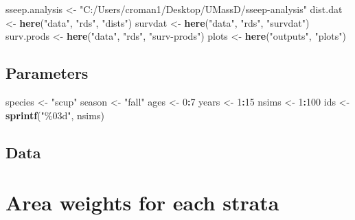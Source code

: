 \documentclass[
]{article}
\newenvironment{Shaded}{\begin{snugshade}}{\end{snugshade}}
\newcommand{\DecValTok}[1]{\textcolor[rgb]{0.00,0.00,0.81}{#1}}
\newcommand{\FunctionTok}[1]{\textcolor[rgb]{0.13,0.29,0.53}{\textbf{#1}}}
\newcommand{\NormalTok}[1]{#1}
\newcommand{\OtherTok}[1]{\textcolor[rgb]{0.56,0.35,0.01}{#1}}
\newcommand{\SpecialCharTok}[1]{\textcolor[rgb]{0.81,0.36,0.00}{\textbf{#1}}}
\newcommand{\StringTok}[1]{\textcolor[rgb]{0.31,0.60,0.02}{#1}}
\begin{document}
\begin{Shaded}
\begin{Highlighting}[]
\NormalTok{sseep.analysis }\OtherTok{\textless{}{-}} \StringTok{"C:/Users/croman1/Desktop/UMassD/sseep{-}analysis"}
\NormalTok{dist.dat }\OtherTok{\textless{}{-}} \FunctionTok{here}\NormalTok{(}\StringTok{"data"}\NormalTok{, }\StringTok{"rds"}\NormalTok{, }\StringTok{"dists"}\NormalTok{)}
\NormalTok{survdat }\OtherTok{\textless{}{-}} \FunctionTok{here}\NormalTok{(}\StringTok{"data"}\NormalTok{, }\StringTok{"rds"}\NormalTok{, }\StringTok{"survdat"}\NormalTok{)}
\NormalTok{surv.prods }\OtherTok{\textless{}{-}} \FunctionTok{here}\NormalTok{(}\StringTok{"data"}\NormalTok{, }\StringTok{"rds"}\NormalTok{, }\StringTok{"surv{-}prods"}\NormalTok{)}
\NormalTok{plots }\OtherTok{\textless{}{-}} \FunctionTok{here}\NormalTok{(}\StringTok{"outputs"}\NormalTok{, }\StringTok{"plots"}\NormalTok{)}
\end{Highlighting}
\end{Shaded}

\subsection{Parameters}\label{parameters}

\begin{Shaded}
\begin{Highlighting}[]
\NormalTok{species }\OtherTok{\textless{}{-}} \StringTok{"scup"}
\NormalTok{season  }\OtherTok{\textless{}{-}} \StringTok{"fall"}
\NormalTok{ages      }\OtherTok{\textless{}{-}} \DecValTok{0}\SpecialCharTok{:}\DecValTok{7}
\NormalTok{years     }\OtherTok{\textless{}{-}} \DecValTok{1}\SpecialCharTok{:}\DecValTok{15}
\NormalTok{nsims   }\OtherTok{\textless{}{-}} \DecValTok{1}\SpecialCharTok{:}\DecValTok{100}
\NormalTok{ids     }\OtherTok{\textless{}{-}} \FunctionTok{sprintf}\NormalTok{(}\StringTok{"\%03d"}\NormalTok{, nsims)}
\end{Highlighting}
\end{Shaded}

\subsection{Data}\label{data}

\section{Area weights for each
strata}\label{area-weights-for-each-strata}
\end{document}
